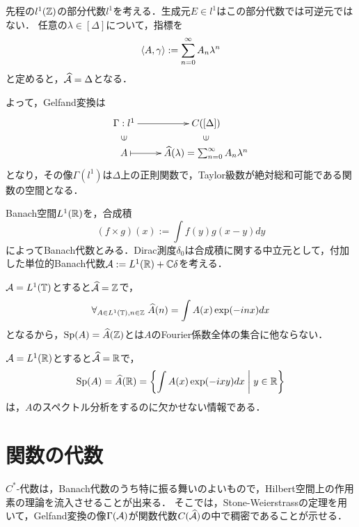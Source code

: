 \documentclass[uplatex,dvipdfmx]{jsreport}
\begin{document}
\begin{example}[絶対収束数列の部分代数と絶対収束するTaylor級数を持つ正則関数の間のGelfand変換]
    先程の$l^1(\mathbb{Z})$の部分代数$l^1$を考える．生成元$E\in l^1$はこの部分代数では可逆元ではない．
    任意の$\lambda\in[\Delta]$について，指標を
    \[\langle A,\gamma\rangle:=\sum^\infty_{n=0}A_n\lambda^n\]
    と定めると，$\widehat{\mathcal{A}}=\Delta$となる．

    よって，Gelfand変換は
    \[\xymatrix@R-2pc{
        \Gamma:l^1\ar[r]&C([\Delta])\\
        \rotatebox[origin=c]{90}{$\in$}&\rotatebox[origin=c]{90}{$\in$}\\
        A\ar@{|->}[r]&\wh{A}(\lambda)=\sum^\infty_{n=0}A_n\lambda^n
    }\]
    となり，その像$\Gamma(l^1)$は$\Delta$上の正則関数で，Taylor級数が絶対総和可能である関数の空間となる．
\end{example}

\begin{example}[可積分関数のBanach代数に関するGelfand変換はFourier変換に他ならない]
    Banach空間$L^1(\mathbb{R})$を，合成積
    \[(f\times g)(x):=\int f(y)g(x-y)dy\]
    によってBanach代数とみる．Dirac測度$\delta_0$は合成積に関する中立元として，付加した単位的Banach代数$\mathcal{A}:=L^1(\mathbb{R})+\mathbb{C}\delta$を考える．


\end{example}
\begin{remark}[Fourier係数全体の集合としてのスペクトル]\label{remark-spectrum-as-Fourier-coefficient}
    $\mathcal{A}=L^1(\mathbb{T})$とすると$\widehat{\mathcal{A}}=\mathbb{Z}$で，
    \[\forall_{A\in L^1(\mathbb{T}),n\in\mathbb{Z}}\;\widehat{A}(n)=\int A(x)\exp(-inx)dx\]
    となるから，$\mathrm{Sp}(A)=\widehat{A}(\mathbb{Z})$とは$A$のFourier係数全体の集合に他ならない．

    $\mathcal{A}=L^1(\mathbb{R})$とすると$\widehat{\mathcal{A}}=\mathbb{R}$で，
    \[\mathrm{Sp}(A)=\widehat{A}(\mathbb{R})=\left\{\int A(x)\exp(-ixy)dx\;\middle|\;y\in\mathbb{R}\right\}\]
    は，$A$のスペクトル分析をするのに欠かせない情報である．
\end{remark}

\section{関数の代数}

\begin{tcolorbox}[colframe=ForestGreen, colback=ForestGreen!10!white,breakable,colbacktitle=ForestGreen!40!white,coltitle=black,fonttitle=\bfseries\sffamily,
title=]
    $C^*$-代数は，Banach代数のうち特に振る舞いのよいもので，Hilbert空間上の作用素の理論を流入させることが出来る．
    そこでは，Stone-Weierstrassの定理を用いて，Gelfand変換の像$\Gamma(\mathcal{A})$が関数代数$C(\widehat{\mathcal{A}})$の中で稠密であることが示せる．
\end{tcolorbox}
\end{document}
